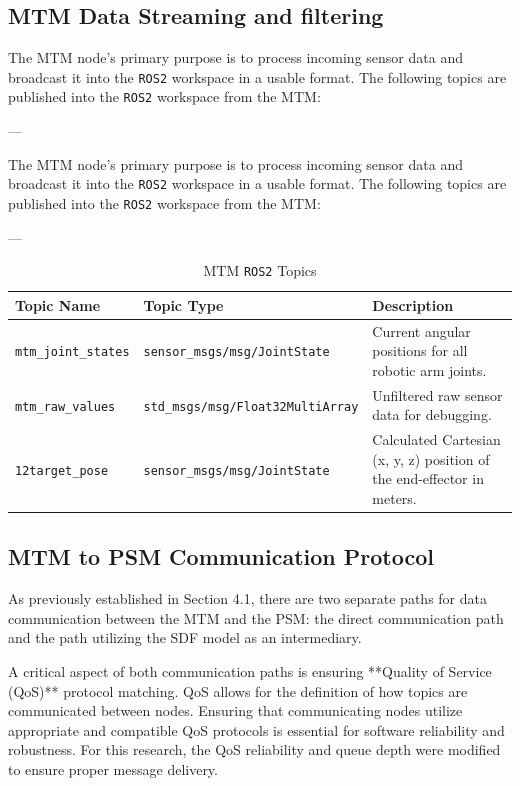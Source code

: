\subsection{MTM Data Streaming and filtering}

The MTM node's primary purpose is to process incoming sensor data and broadcast it into the \texttt{ROS2} workspace in a usable format. The following topics are published into the \texttt{ROS2} workspace from the MTM:

---

The MTM node's primary purpose is to process incoming sensor data and broadcast it into the \texttt{ROS2} workspace in a usable format. The following topics are published into the \texttt{ROS2} workspace from the MTM:

---

\begin{table}[h!]
    \centering
    \caption{MTM \texttt{ROS2} Topics}
    \label{tab:mtm_ros2_topics}
    \begin{tabular}{|l|l|p{5cm}|} %
        \hline
        \textbf{Topic Name} & \textbf{Topic Type} & \textbf{Description} \\
        \hline
        \texttt{mtm\_joint\_states} & \texttt{sensor\_msgs/msg/JointState} & Current angular positions for all robotic arm joints. \\
        \hline
        \texttt{mtm\_raw\_values} & \texttt{std\_msgs/msg/Float32MultiArray} & Unfiltered raw sensor data for debugging. \\
        \hline
        \texttt{12target\_pose} & \texttt{sensor\_msgs/msg/JointState} & Calculated Cartesian (x, y, z) position of the end-effector in meters. \\
        \hline
    \end{tabular}
\end{table}

\subsection{MTM to PSM Communication Protocol}

As previously established in Section 4.1, there are two separate paths for data communication between the MTM and the PSM: the direct communication path and the path utilizing the SDF model as an intermediary.

A critical aspect of both communication paths is ensuring **Quality of Service (QoS)** protocol matching. QoS allows for the definition of how topics are communicated between nodes. Ensuring that communicating nodes utilize appropriate and compatible QoS protocols is essential for software reliability and robustness. For this research, the QoS reliability and queue depth were modified to ensure proper message delivery.

